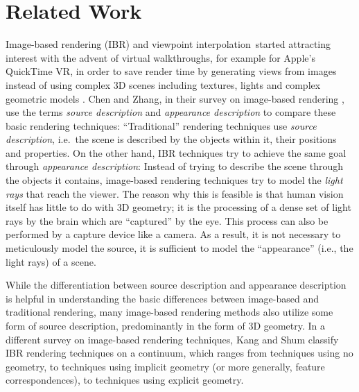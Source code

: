 \section{Related Work}\label{sec:related_work}
Image-based rendering (IBR) and viewpoint interpolation\footnotemark\ started attracting interest with the advent of virtual walkthroughs, for example for Apple's QuickTime\textsuperscript{\textregistered} VR, in order to save render time by generating views from images instead of using complex 3D scenes including textures, lights and complex geometric models \cite{quicktime}.
Chen and Zhang, in their survey on image-based rendering \cite{survey2004}, use the terms \emph{source description} and \emph{appearance description} to compare these basic rendering techniques: ``Traditional'' rendering techniques use \emph{source description}, i.e.\ the scene is described by the objects within it, their positions and properties. On the other hand, IBR techniques try to achieve the same goal through \emph{appearance description}:
Instead of trying to describe the scene through the objects it contains, image-based rendering techniques try to model the \emph{light rays} that reach the viewer.
The reason why this is feasible is that human vision itself has little to do with 3D geometry; it is the processing of a dense set of light rays by the brain which are ``captured'' by the eye. This process can also be performed by a capture device like a camera. As a result, it is not necessary to meticulously model the source, it is sufficient to model the ``appearance'' (i.e., the light rays) of a scene.


While the differentiation between source description and appearance description is helpful in understanding the basic differences between image-based and traditional rendering, many image-based rendering methods also utilize some form of source description, predominantly in the form of 3D geometry. In a different survey on image-based rendering techniques, Kang and Shum \cite{survey2000} classify IBR rendering techniques on a continuum, which ranges from techniques using no geometry, to techniques using implicit geometry (or more generally, feature correspondences), to techniques using explicit geometry. %

